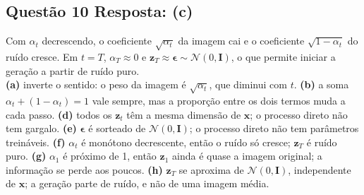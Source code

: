 \documentclass[11pt,a4paper]{article}
\begin{document}
\subsection*{Questão 10 \textemdash{} Resposta: (c)}
Com $\alpha_t$ decrescendo, o coeficiente $\sqrt{\alpha_t}$ da imagem cai e o coeficiente $\sqrt{1 - \alpha_t}$ do ruído cresce. Em $t = T$, $\alpha_T \approx 0$ e $\mathbf{z}_T \approx \boldsymbol{\epsilon} \sim \mathcal{N}(0, \mathbf{I})$, o que permite iniciar a geração a partir de ruído puro.\\
\textbf{(a)} inverte o sentido: o peso da imagem é $\sqrt{\alpha_t}$, que diminui com $t$.
\textbf{(b)} a soma $\alpha_t + (1 - \alpha_t) = 1$ vale sempre, mas a proporção entre os dois termos muda a cada passo.
\textbf{(d)} todos os $\mathbf{z}_t$ têm a mesma dimensão de $\mathbf{x}$; o processo direto não tem gargalo.
\textbf{(e)} $\boldsymbol{\epsilon}$ é sorteado de $\mathcal{N}(0, \mathbf{I})$; o processo direto não tem parâmetros treináveis.
\textbf{(f)} $\alpha_t$ é monótono decrescente, então o ruído só cresce; $\mathbf{z}_T$ é ruído puro.
\textbf{(g)} $\alpha_1$ é próximo de 1, então $\mathbf{z}_1$ ainda é quase a imagem original; a informação se perde aos poucos.
\textbf{(h)} $\mathbf{z}_T$ se aproxima de $\mathcal{N}(0, \mathbf{I})$, independente de $\mathbf{x}$; a geração parte de ruído, e não de uma imagem média.

\color{black}
\end{document}
